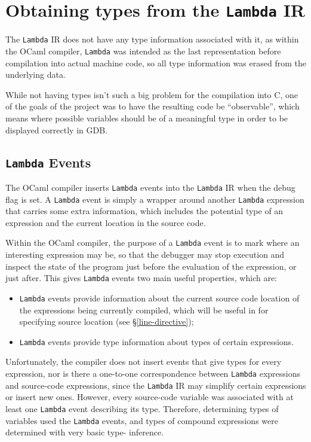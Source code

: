 \section{Obtaining types from the \texttt{Lambda} IR} \label{lambda-types}

The \texttt{Lambda} IR does not have any type information associated with it, as
within the OCaml compiler, \texttt{Lambda} was intended as the last
representation before compilation into actual machine code, so all type
information was erased from the underlying data.

While not having types isn't such a big problem for the compilation into C, one
of the goals of the project was to have the resulting code be ``observable'',
which means where possible variables should be of a meaningful type in order to
be displayed correctly in GDB.

\subsection{\texttt{Lambda} Events} \label{levents}

The OCaml compiler inserts \texttt{Lambda} events into the \texttt{Lambda} IR
when the debug flag is set. A \texttt{Lambda} event is simply a wrapper around
another \texttt{Lambda} expression that carries some extra information, which
includes the potential type of an expression and the current location in the
source code.

Within the OCaml compiler, the purpose of a \texttt{Lambda} event is to mark
where an interesting expression may be, so that the debugger may stop execution
and inspect the state of the program just before the evaluation of the
expression, or just after. This gives \texttt{Lambda} events two main useful
properties, which are:

\begin{itemize}

\item \texttt{Lambda} events provide information about the current source code
    location of the expressions being currently compiled, which will be useful
    in for specifying source location (see \S\ref{line-directive});

\item \texttt{Lambda} events provide type information about types of certain
    expressions.

\end{itemize}

Unfortunately, the compiler does not insert events that give types for every
expression, nor is there a one-to-one correspondence between \texttt{Lambda}
expressions and source-code expressions, since the \texttt{Lambda} IR may
simplify certain expressions or insert new ones. However, every source-code
variable was associated with at least one \texttt{Lambda} event describing its
type. Therefore, determining types of variables used the \texttt{Lambda} events,
and types of compound expressions were determined with very basic type-
inference.

